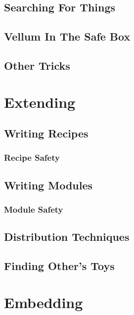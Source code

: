 \section{Searching For Things}


\section{Vellum In The Safe Box}


\section{Other Tricks}



\chapter{Extending}
\label{chapter:Extending}



\section{Writing Recipes}


\subsection{Recipe Safety}


\section{Writing Modules}


\subsection{Module Safety}


\section{Distribution Techniques}


\section{Finding Other's Toys}



\chapter{Embedding}
\label{chapter:Embedding}



